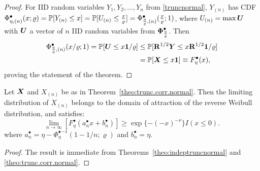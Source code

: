 \begin{proof}
  For IID random variables  $Y_1,Y_2,\ldots,Y_n$ from \eqref{truncnormal},
  $Y_{(n)}$ has
CDF $\Phi^\bullet_{\eta,(n)}(x;\varrho) = \mathbb{P}[Y_{(n)}\leq x]
=\mathbb{P}[U_{(n)}\leq \frac x\varrho] =
\Phi^\bullet_{\frac\eta\varrho,(n)}(\frac x\varrho;1)$, where $U_{(n)}
=\max\boldsymbol{U}$ with $\boldsymbol{U}$ a vector of $n$ IID random variables from $\boldsymbol{\Phi}^\bullet_{\frac\eta\varrho}$. Then 
  \begin{equation*}
    \begin{split}
      \Phi^\bullet_{\frac\eta\varrho,(n)}(x/\varrho;1)  = \mP[\bU \leq x \bone/\varrho]
      &\leq  \mP[{\bf R}^{1/2}\bY \leq x {\bf R}^{1/2}\bone/\varrho]\\
      &       = \mP[\bX \leq x \bone] \equiv   F^\bullet_\eta(x), %
    \end{split}
  \end{equation*}
  proving the statement of the theorem.
\end{proof}

\begin{corollary}
  \label{theo:evt.weibull}
  Let $\boldsymbol{X}$ and $X_{(n)}$ be as in Theorem~\ref{theo:trunc.corr.normal}. Then the limiting
  distribution of $X_{(n)}$ belongs to the domain of attraction of
  the reverse Weibull distribution, and satisfies:
  \begin{equation}
    \lim_{n\rightarrow \infty}[F_{\eta}^\bullet (a^\bullet_nx
      + b^\bullet_n)] \geq \exp{\{-(-x)^{-\nu}\}} I(x \leq 0).
\end{equation}
where $a_n^\bullet = \eta - {\Phi_{\eta}^\bullet}^{-1}(1-1/n;\varrho)$ and $b_n^\bullet = \eta$.
\begin{proof}
The result is immediate from Theorems~\ref{theo:indeptruncnormal} 
and %
 \ref{theo:trunc.corr.normal}. 
\end{proof}
\end{corollary}


